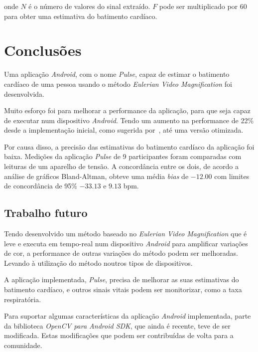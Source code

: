 \documentclass[9pt,a4paper]{extarticle}
\newcommand{\evm}{\emph{Eulerian Video Magnification}}
\begin{document}
\begin{multicols}{2}
onde $N$ é o número de valores do sinal extraído. $F$ pode ser multiplicado
por 60 para obter uma estimativa do batimento cardíaco.

\section{Conclusões}\label{sec:conclusions}

Uma aplicação \emph{Android}, com o nome \emph{Pulse}, capaz de estimar o
batimento cardíaco de uma pessoa usando o método \evm{} foi desenvolvida.

Muito esforço foi para melhorar a performance da aplicação, para que seja capaz
de executar num dispositivo \emph{Android}. Tendo um aumento na performance
de 22\% desde a implementação inicial, como sugerida por~\cite{Wu2012Eulerian},
até uma versão otimizada.

Por causa disso, a precisão das estimativas do batimento cardíaco da aplicação
foi baixa. Medições da aplicação \emph{Pulse} de 9 participantes foram
comparadas com leituras de um aparelho de tensão. A concordância entre os dois,
de acordo a análise de gráficos Bland-Altman, obteve uma média \emph{bias}
de $-12.00$ com limites de concordância de 95\% $-33.13$ e $9.13$ bpm.

\subsection{Trabalho futuro}\label{sec:future}

Tendo desenvolvido um método baseado no \evm{} que é leve e executa em
tempo-real num dispositivo \emph{Android} para amplificar variações de cor,
a performance de outras variações do método podem ser melhoradas. Levando
à utilização do método noutros tipos de dispositivos.

A aplicação implementada, \emph{Pulse}, precisa de melhorar as suas estimativas
do batimento cardíaco, e outros sinais vitais podem ser monitorizar, como
a taxa respiratória.

Para suportar algumas características da aplicação \emph{Android} implementada,
parte da biblioteca \emph{OpenCV para Android SDK}, que ainda é recente,
teve de ser modificada. Estas modificações que podem ser contribuídas de volta
para a comunidade.



\end{multicols}
\end{document}
